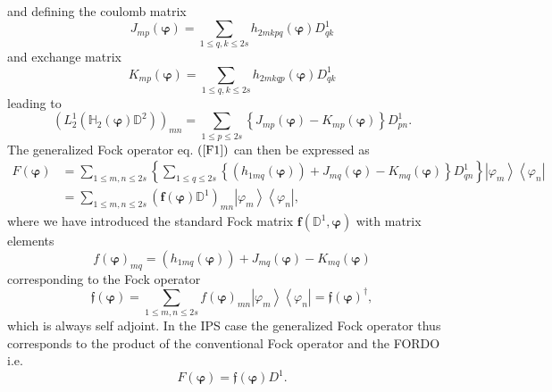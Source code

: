 \documentclass[aps,preprint]{revtex4}%
\begin{document}
and defining the coulomb matrix
\begin{equation}
J_{mp}\left(  \mathbf{\varphi}\right)  =\sum_{1\leq q,k\leq2s}h_{2mkpq}\left(
\mathbf{\varphi}\right)  D_{qk}^{1}%
\end{equation}
and exchange matrix
\begin{equation}
K_{mp}\left(  \mathbf{\varphi}\right)  =\sum_{1\leq q,k\leq2s}h_{2mkqp}\left(
\mathbf{\varphi}\right)  D_{qk}^{1}%
\end{equation}
leading to
\begin{equation}
\left(  L_{2}^{1}\left(  \mathbb{H}_{2}\left(  \mathbf{\varphi}\right)
\mathbb{D}^{2}\right)  \right)  _{mn}=\sum_{1\leq p\leq2s}\left\{
J_{mp}\left(  \mathbf{\varphi}\right)  -K_{mp}\left(  \mathbf{\varphi}\right)
\right\}  D_{pn}^{1}.
\end{equation}
The generalized Fock operator eq. $\left(  \ref{F1}\right)  $ can then be
expressed as
\begin{align}
F\left(  \mathbf{\varphi}\right)   &  =\sum_{1\leq m,n\leq2s}\left\{
\sum_{1\leq q\leq2s}\left\{  \left(  h_{1mq}\left(  \mathbf{\varphi}\right)
\right)  +J_{mq}\left(  \mathbf{\varphi}\right)  -K_{mq}\left(
\mathbf{\varphi}\right)  \right\}  D_{qn}^{1}\right\}  \left\vert \varphi
_{m}\right\rangle \left\langle \varphi_{n}\right\vert \nonumber\\
&  =\sum_{1\leq m,n\leq2s}\left(  \mathbf{f}\left(  \mathbf{\varphi}\right)
\mathbb{D}^{1}\right)  _{mn}\left\vert \varphi_{m}\right\rangle \left\langle
\varphi_{n}\right\vert ,
\end{align}
where we have introduced the standard Fock matrix $\mathbf{f}\left(
\mathbb{D}^{1},\mathbf{\varphi}\right)  $ with matrix elements
\begin{equation}
f\left(  \mathbf{\varphi}\right)  _{mq}=\left(  h_{1mq}\left(  \mathbf{\varphi
}\right)  \right)  +J_{mq}\left(  \mathbf{\varphi}\right)  -K_{mq}\left(
\mathbf{\varphi}\right)
\end{equation}
corresponding to the Fock operator
\begin{equation}
\mathfrak{f}\left(  \mathbf{\varphi}\right)  =\sum_{1\leq m,n\leq2s}f\left(
\mathbf{\varphi}\right)  _{mn}\left\vert \varphi_{m}\right\rangle \left\langle
\varphi_{n}\right\vert =\mathfrak{f}\left(  \mathbf{\varphi}\right)
^{\dagger},
\end{equation}
which is always self adjoint. In the IPS case the generalized Fock operator
thus corresponds to the product of the conventional Fock operator and the
FORDO i.e.
\begin{equation}
F\left(  \mathbf{\varphi}\right)  =\mathfrak{f}\left(  \mathbf{\varphi
}\right)  D^{1}.
\end{equation}
\end{document}
